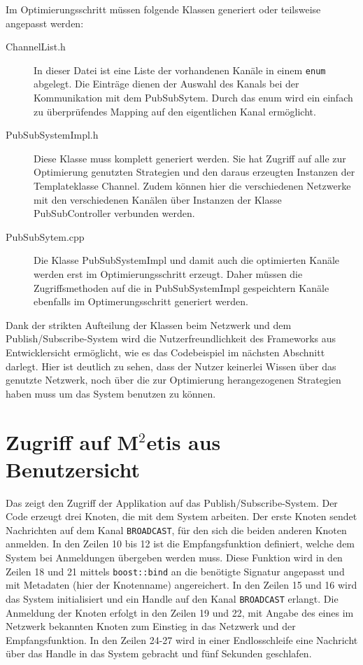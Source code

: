 Im Optimierungsschritt müssen folgende Klassen generiert oder teilsweise angepasst werden:
\begin{description}
\item[ChannelList.h] In dieser Datei ist eine Liste der vorhandenen Kanäle in einem \texttt{enum} abgelegt. Die Einträge dienen der Auswahl des Kanals bei der Kommunikation mit dem PubSubSytem. Durch das enum wird ein einfach zu überprüfendes Mapping auf den eigentlichen Kanal ermöglicht.
\item[PubSubSystemImpl.h] Diese Klasse muss komplett generiert werden. Sie hat Zugriff auf alle zur Optimierung genutzten Strategien und den daraus erzeugten Instanzen der Templateklasse Channel. Zudem können hier die verschiedenen Netzwerke mit den verschiedenen Kanälen über Instanzen der Klasse PubSubController verbunden werden.
\item[PubSubSytem.cpp] Die Klasse PubSubSystemImpl und damit auch die optimierten Kanäle werden erst im Optimierungsschritt erzeugt. Daher müssen die Zugriffsmethoden auf die in PubSubSystemImpl gespeichtern Kanäle ebenfalls im Optimerungsschritt generiert werden.
\end{description}

Dank der strikten Aufteilung der Klassen beim Netzwerk und dem Publish/Subscribe-System wird die Nutzerfreundlichkeit des Frameworks aus Entwicklersicht ermöglicht, wie es das Codebeispiel im nächsten Abschnitt darlegt. Hier ist deutlich zu sehen, dass der Nutzer keinerlei Wissen über das genutzte Netzwerk, noch über die zur Optimierung herangezogenen Strategien haben muss um das System benutzen zu können.

\section*{Zugriff auf M$^2$etis aus Benutzersicht}
Das  zeigt den Zugriff der Applikation auf das Publish/Subscribe-System. Der Code erzeugt drei Knoten, die mit dem System arbeiten. Der erste Knoten sendet Nachrichten auf dem Kanal \texttt{BROADCAST}, für den sich die beiden anderen Knoten anmelden. In den Zeilen 10 bis 12 ist die Empfangsfunktion definiert, welche dem System bei Anmeldungen übergeben werden muss. Diese Funktion wird in den Zeilen 18 und 21 mittels \texttt{boost::bind} an die benötigte Signatur angepasst und mit Metadaten (hier der Knotenname) angereichert. In den Zeilen 15 und 16 wird das System initialisiert und ein Handle auf den Kanal \texttt{BROADCAST} erlangt. Die Anmeldung der Knoten erfolgt in den Zeilen 19 und 22, mit Angabe des eines im Netzwerk bekannten Knoten zum Einstieg in das Netzwerk und der Empfangsfunktion. In den Zeilen 24-27 wird in einer Endlosschleife eine Nachricht über das Handle in das System gebracht und fünf Sekunden geschlafen.

